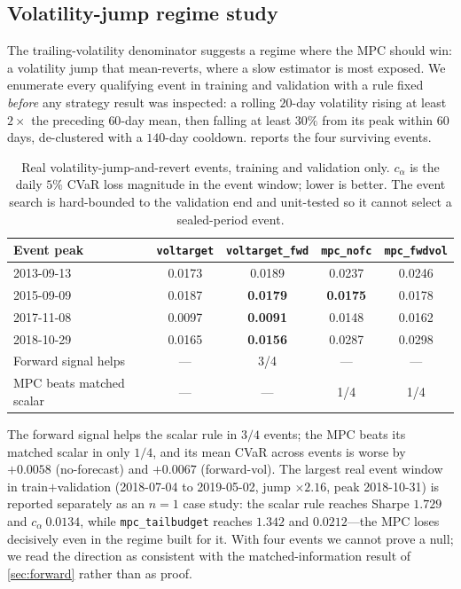 \documentclass[journal]{IEEEtran}
\newcommand{\ours}[1]{\textcolor{blue!70!black}{\textbf{#1}}}
\newcommand{\best}[1]{\textbf{#1}}
\begin{document}
\subsection{Volatility-jump regime study}
\label{sec:jump}

The trailing-volatility denominator suggests a regime where the MPC should win: a
volatility jump that mean-reverts, where a slow estimator is most exposed. We
enumerate every qualifying event in training and validation with a rule fixed
\emph{before} any strategy result was inspected: a rolling $20$-day volatility
rising at least $2\times$ the preceding $60$-day mean, then falling at least $30\%$
from its peak within $60$ days, de-clustered with a $140$-day cooldown.
 reports the four surviving events.

\begin{table}[!t]
  \centering
  \caption{Real volatility-jump-and-revert events, training and validation only.
  $c_\alpha$ is the daily $5\%$ CVaR loss magnitude in the event window; lower is
  better. The event search is hard-bounded to the validation end and unit-tested
  so it cannot select a sealed-period event.}
  \label{tab:events}
  \begin{tabular}{lcccc}
    \toprule
    Event peak & \texttt{voltarget} & \texttt{voltarget\_fwd} &
    \ours{\texttt{mpc\_nofc}} & \ours{\texttt{mpc\_fwdvol}} \\
    \midrule
    2013-09-13 & 0.0173 & 0.0189 & 0.0237 & 0.0246 \\
    2015-09-09 & 0.0187 & \best{0.0179} & \best{0.0175} & 0.0178 \\
    2017-11-08 & 0.0097 & \best{0.0091} & 0.0148 & 0.0162 \\
    2018-10-29 & 0.0165 & \best{0.0156} & 0.0287 & 0.0298 \\
    \midrule
    Forward signal helps & --- & 3/4 & --- & --- \\
    MPC beats matched scalar & --- & --- & 1/4 & 1/4 \\
    \bottomrule
  \end{tabular}
\end{table}

The forward signal helps the scalar rule in $3/4$ events; the MPC beats its matched
scalar in only $1/4$, and its mean CVaR across events is worse by $+0.0058$
(no-forecast) and $+0.0067$ (forward-vol). The largest real event window in
train$+$validation (2018-07-04 to 2019-05-02, jump $\times 2.16$, peak
2018-10-31) is reported separately as an $n=1$ case study: the scalar rule reaches
Sharpe $1.729$ and $c_\alpha\ 0.0134$, while \texttt{mpc\_tailbudget} reaches
$1.342$ and $0.0212$---the MPC loses decisively even in the regime built for it.
With four events we cannot prove a null; we read the direction as consistent with
the matched-information result of \cref{sec:forward} rather than as proof.
\end{document}
